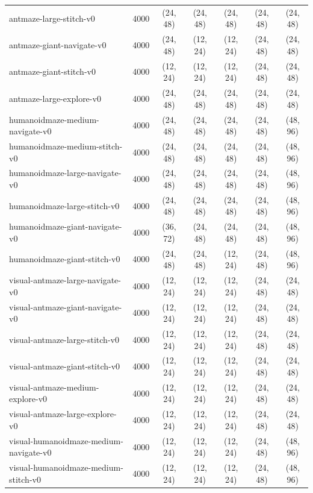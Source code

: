 \documentclass{article} %
\begin{document}
\begin{table}[t]
\begin{tabular*}{\linewidth}{@{\extracolsep{\fill}} l r c c c c c}
        antmaze-large-stitch-v0      & 4000 & (24, 48) & (24, 48) & (24, 48) & (24, 48) & (24, 48)\\
        antmaze-giant-navigate-v0     & 4000 & (24, 48) & (12, 24) & (12, 24) & (24, 48) & (24, 48)\\
        antmaze-giant-stitch-v0       & 4000 & (12, 24) & (12, 24) & (12, 24) & (24, 48) & (24, 48)\\
        antmaze-large-explore-v0      & 4000 & (24, 48) & (24, 48) & (24, 48) & (24, 48) & (24, 48)\\
        humanoidmaze-medium-navigate-v0      & 4000 & (24, 48) & (24, 48) & (24, 48) & (24, 48) & (48, 96)\\
        humanoidmaze-medium-stitch-v0      & 4000 & (24, 48) & (24, 48) & (24, 48) & (24, 48) & (48, 96)\\
        humanoidmaze-large-navigate-v0      & 4000 & (24, 48) & (24, 48) & (24, 48) & (24, 48) & (48, 96)\\
        humanoidmaze-large-stitch-v0      & 4000 & (24, 48) & (24, 48) & (24, 48) & (24, 48) & (48, 96)\\
        humanoidmaze-giant-navigate-v0& 4000 & (36, 72) & (24, 48) & (24, 48) & (24, 48) & (48, 96)\\
        humanoidmaze-giant-stitch-v0  & 4000 & (24, 48) & (24, 48) & (12, 24) & (24, 48) & (48, 96)\\
        visual-antmaze-large-navigate-v0  & 4000 & (12, 24) & (12, 24) & (12, 24) & (24, 48) & (24, 48)\\
        visual-antmaze-giant-navigate-v0  & 4000 & (12, 24) & (12, 24) & (12, 24) & (24, 48) & (24, 48)\\
        visual-antmaze-large-stitch-v0    & 4000 & (12, 24) & (12, 24) & (12, 24) & (24, 48) & (24, 48)\\
        visual-antmaze-giant-stitch-v0    & 4000 & (12, 24) & (12, 24) & (12, 24) & (24, 48) & (24, 48)\\
        visual-antmaze-medium-explore-v0  & 4000 & (12, 24) & (12, 24) & (12, 24) & (24, 48) & (24, 48)\\
        visual-antmaze-large-explore-v0   & 4000 & (12, 24) & (12, 24) & (12, 24) & (24, 48) & (24, 48)\\
        visual-humanoidmaze-medium-navigate-v0 & 4000 & (12, 24) & (12, 24) & (12, 24) & (24, 48) & (48, 96)\\
        visual-humanoidmaze-medium-stitch-v0   & 4000 & (12, 24) & (12, 24) & (12, 24) & (24, 48) & (48, 96)\\
        \bottomrule
    \end{tabular*}
\end{table}
\end{document}
